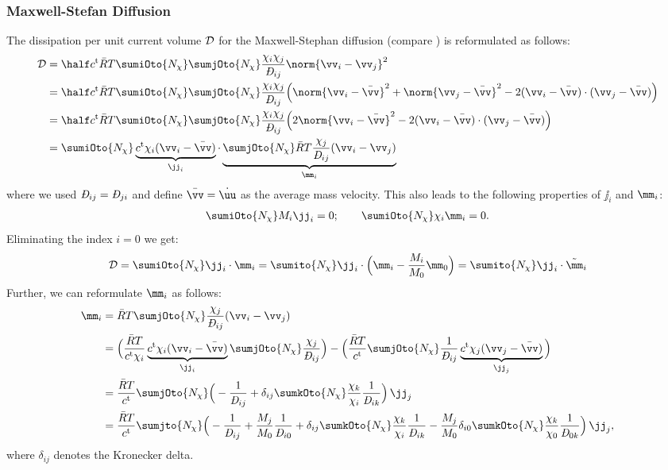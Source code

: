 \subsubsection{Maxwell-Stefan Diffusion} \label{app:MS} %
The dissipation per unit current volume $\mathcal{D}$ for the Maxwell-Stephan diffusion (compare \cite{taylor_multicomponent_1993}) is reformulated as follows:
\begin{align}
  \begin{split}
    \Diss &= \half\ct\RT\sumiOto{\Nchi}\sumjOto{\Nchi} \frac{\chi_i\chi_j}{\DiffMS_{ij}} \norm{\vv_i-\vv_j}^2 \\
    &= \half\ct\RT\sumiOto{\Nchi}\sumjOto{\Nchi}\frac{\chi_i\chi_j}{\DiffMS_{ij}} \Big(\norm{\vv_i-\bar\vv}^2+\norm{\vv_j-\bar\vv}^2 - 2(\vv_i-\bar\vv)\cdot(\vv_j-\bar\vv) \Big) \\
    &= \half\ct\RT\sumiOto{\Nchi}\sumjOto{\Nchi}\frac{\chi_i\chi_j}{\DiffMS_{ij}} \Big(2\norm{\vv_i-\bar\vv}^2 - 2(\vv_i-\bar\vv)\cdot(\vv_j-\bar\vv)\Big) \\
    &= \sumiOto{\Nchi} \underbrace{\ct \chi_i(\vv_i-\bar\vv)}_{\jj_i} \cdot \underbrace{\sumjOto{\Nchi} \RT \frac{\chi_j}{\DiffMS_{ij}} (\vv_i-\vv_j)}_{\mm_i}
  \end{split}
\end{align}
where we used $\DiffMS_{ij}=\DiffMS_{ji}$ and define $\bar\vv=\dot\uu$ as the average mass velocity. This also leads to the following properties of $\jj_i$ and $\mm_i$:
\begin{align}
  \sumiOto{\Nchi} M_i\jj_i = 0; \qquad \sumiOto{\Nchi} \chi_i \mm_i = 0. 
\end{align}
Eliminating the index $i=0$ we get:
\begin{align}
  \Diss = \sumiOto{\Nchi} \jj_i \cdot \mm_i = \sumito{\Nchi} \jj_i \cdot \Big(\mm_i-\frac{M_i}{M_0}\mm_0\Big) = \sumito{\Nchi} \jj_i \cdot \tilde\mm_i
\end{align}
Further, we can reformulate $\mm_i$ as follows:
\begin{align}
  \begin{split}
    \mm_i &= \RT \sumjOto{\Nchi} \frac{\chi_j}{\DiffMS_{ij}} (\vv_i-\vv_j) \\
          &= \Big(\frac{\RT}{\ct\chi_i} \underbrace{\ct\chi_i(\vv_i-\bar\vv)}_{\jj_i} \sumjOto{\Nchi} \frac{\chi_j}{\DiffMS_{ij}} \Big)
          - \Big(\frac{\RT}{\ct}\sumjOto{\Nchi} \frac{1}{\DiffMS_{ij}} \underbrace{\ct\chi_j(\vv_j-\bar\vv)}_{\jj_j} \Big) \\
          &= \frac{\RT}{\ct} \sumjOto{\Nchi} \Big(-\frac{1}{\DiffMS_{ij}} + \delta_{ij} \sumkOto{\Nchi} \frac{\chi_k}{\chi_i} \frac{1}{\DiffMS_{ik}} \Big) \, \jj_j \\
          &= \frac{\RT}{\ct} \sumjto{\Nchi} \Big(-\frac{1}{\DiffMS_{ij}} + \frac{M_j}{M_0}\frac{1}{\DiffMS_{i0}} + \delta_{ij} \sumkOto{\Nchi} \frac{\chi_k}{\chi_i} \frac{1}{\DiffMS_{ik}} - \frac{M_j}{M_0} \delta_{i0} \sumkOto{\Nchi} \frac{\chi_k}{\chi_0}\frac{1}{\DiffMS_{0k}}\Big) \, \jj_j,
  \end{split}
\end{align}
where $\delta_{ij}$ denotes the Kronecker delta.

